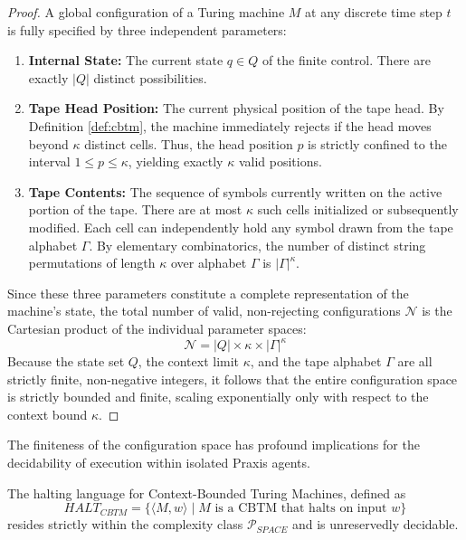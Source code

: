 \begin{proof}
A global configuration of a Turing machine $M$ at any discrete time step $t$ is fully specified by three independent parameters:
\begin{enumerate}
    \item \textbf{Internal State:} The current state $q \in Q$ of the finite control. There are exactly $|Q|$ distinct possibilities.
    \item \textbf{Tape Head Position:} The current physical position of the tape head. By Definition \ref{def:cbtm}, the machine immediately rejects if the head moves beyond $\kappa$ distinct cells. Thus, the head position $p$ is strictly confined to the interval $1 \le p \le \kappa$, yielding exactly $\kappa$ valid positions.
    \item \textbf{Tape Contents:} The sequence of symbols currently written on the active portion of the tape. There are at most $\kappa$ such cells initialized or subsequently modified. Each cell can independently hold any symbol drawn from the tape alphabet $\Gamma$. By elementary combinatorics, the number of distinct string permutations of length $\kappa$ over alphabet $\Gamma$ is $|\Gamma|^\kappa$.
\end{enumerate}

Since these three parameters constitute a complete representation of the machine's state, the total number of valid, non-rejecting configurations $\mathcal{N}$ is the Cartesian product of the individual parameter spaces:
\begin{equation}
\mathcal{N} = |Q| \times \kappa \times |\Gamma|^\kappa
\end{equation}
Because the state set $Q$, the context limit $\kappa$, and the tape alphabet $\Gamma$ are all strictly finite, non-negative integers, it follows that the entire configuration space is strictly bounded and finite, scaling exponentially only with respect to the context bound $\kappa$.
\end{proof}

The finiteness of the configuration space has profound implications for the decidability of execution within isolated Praxis agents.

\begin{theorem}
\label{thm:cbtm_halting}
The halting language for Context-Bounded Turing Machines, defined as 
$$HALT_{CBTM} = \{ \langle M, w \rangle \mid M \text{ is a CBTM that halts on input } w \}$$
resides strictly within the complexity class $\mathcal{P}_{SPACE}$ and is unreservedly decidable.
\end{theorem}

